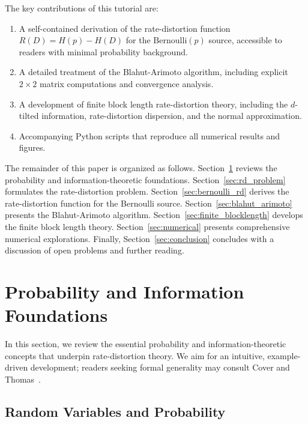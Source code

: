 \documentclass[11pt]{article}
\newcommand{\RD}{R(D)}
\newcommand{\Hp}{H(p)}
\newcommand{\HD}{H(D)}
\newcommand{\Ber}{\mathrm{Bernoulli}}
\begin{document}
The key contributions of this tutorial are:
\begin{enumerate}
    \item A self-contained derivation of the rate-distortion function $\RD = \Hp - \HD$
          for the $\Ber(p)$ source, accessible to readers with minimal probability background.
    \item A detailed treatment of the Blahut-Arimoto algorithm, including explicit
          $2 \times 2$ matrix computations and convergence analysis.
    \item A development of finite block length rate-distortion theory, including the
          $d$-tilted information, rate-distortion dispersion, and the normal approximation.
    \item Accompanying Python scripts that reproduce all numerical results and figures.
\end{enumerate}

The remainder of this paper is organized as follows.
Section~\ref{sec:foundations} reviews the probability and information-theoretic
foundations.
Section~\ref{sec:rd_problem} formulates the rate-distortion problem.
Section~\ref{sec:bernoulli_rd} derives the rate-distortion function for the
Bernoulli source.
Section~\ref{sec:blahut_arimoto} presents the Blahut-Arimoto algorithm.
Section~\ref{sec:finite_blocklength} develops the finite block length theory.
Section~\ref{sec:numerical} presents comprehensive numerical explorations.
Finally, Section~\ref{sec:conclusion} concludes with a discussion of open
problems and further reading.


\section{Probability and Information Foundations}
\label{sec:foundations}

In this section, we review the essential probability and information-theoretic
concepts that underpin rate-distortion theory.
We aim for an intuitive, example-driven development; readers seeking formal
generality may consult Cover and Thomas~\cite{cover2006}.

\subsection{Random Variables and Probability}
\label{subsec:rv}
\end{document}
